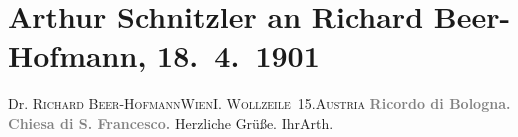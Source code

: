 

         
         \renewcommand{\erwaehntePersonen}{Personen: Richard Beer-Hofmann}
         \renewcommand{\erwaehnteOrte}{Orte: Basilica di San Francesco, Bologna, I., Innere Stadt, Wien, Wollzeile, Österreich}
         \renewcommand{\erwaehnteWerke}{}
               \section[Arthur Schnitzler an Richard Beer-Hofmann, 18. 4. 1901]{ Arthur Schnitzler an Richard Beer-Hofmann, 18. 4. 1901}\nopagebreak{}\rehead{ }\begin{ledgroupsized}[t]{13cm}\normalsize\beginnumbering \toendnotes[C]{\smallbreak\pagebreak[2]} 
\pstart{}{\pb}Dr. \textsc{Richard Beer-Hofmann}\pend{}\pstart{}\textsc{Wien}\pend{}\pstart{}\textsc{I. Wollzeile 15}.\pend{}\pstart{}\textsc{Austria}\pend{}{\bigskip}\pstart
           \noindent{}\raggedleft{}{\pb}\textcolor{gray}{\textbf{Ricordo di Bologna.}}\pend
           \pstart
           \noindent{}\centering{}\textcolor{gray}{\textbf{Chiesa di S. Francesco.}}\pend
           \pstart
           Herzliche Grüße.\pend
           \pstart Ihr\spacefill\mbox{Arth.}\pend{}
         
         \endnumbering{}\end{ledgroupsized}  \newcommand{\dateiname}{L01109}\newcommand{\titel}{Arthur Schnitzler an Richard Beer-Hofmann, 18. 4. 1901}\newcommand{\editorInnen}{Martin Anton Müller und Gerd-Hermann Susen}
      